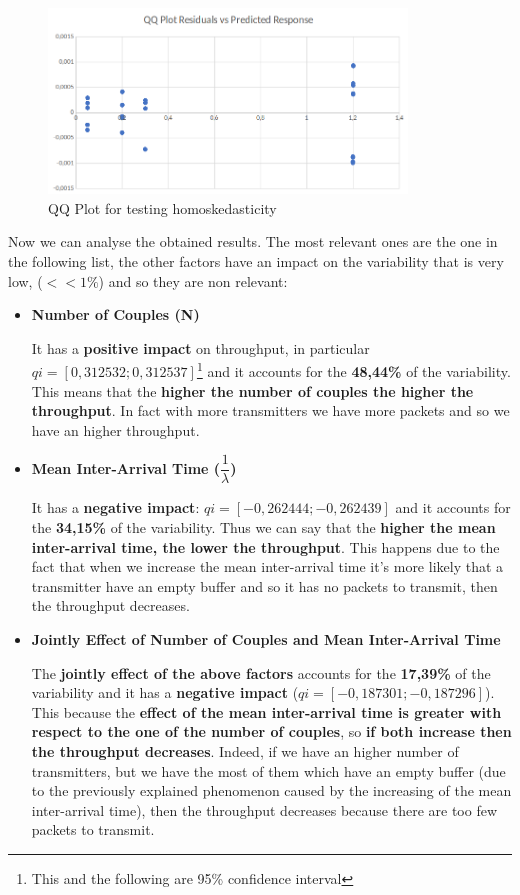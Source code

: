 \begin{figure}[H]
	\centering
	\includegraphics[width=0.85\textwidth]{img/homoskedasticity_2kr_throughput.png}
	\caption{QQ Plot for testing homoskedasticity}
	\label {img: homoskedasticity_throughput}
\end{figure}

\noindent Now we can analyse the obtained results. The most relevant ones are the one in the following list, the other factors have an impact on the variability that is very low, ($<<1\%$) and so they are non relevant:

\begin{itemize}
	\item \textbf{Number of Couples (N)}
	
	\noindent It has a \textbf{positive impact} on throughput, in particular $qi = [0,312532; 0,312537]$\footnote{This and the following are 95\% confidence interval} and it accounts for the \textbf{48,44\%} of the variability. This means that the \textbf{higher the number of couples the higher the throughput}. In fact with more transmitters we have more packets and so we have an higher throughput.
	 
	\item \textbf{Mean Inter-Arrival Time ($\dfrac{1}{\lambda}$)}
	
	\noindent It has a \textbf{negative impact}: $qi = [-0,262444; -0,262439]$ and it accounts for the \textbf{34,15\%} of the variability. Thus we can say that the \textbf{higher the mean inter-arrival time, the lower the throughput}. This happens due to the fact that when we increase the mean inter-arrival time it's more likely that a transmitter have an empty buffer and so it has no packets to transmit, then the throughput decreases. 
	
	\item \textbf{Jointly Effect of Number of Couples and Mean Inter-Arrival Time}
	
	\noindent The \textbf{jointly effect of the above factors} accounts for the \textbf{17,39\%} of the variability and it has a \textbf{negative impact} ($qi = [-0,187301; -0,187296]$). This because the \textbf{effect of the mean inter-arrival time is greater with respect to the one of the number of couples}, so \textbf{if both increase then the throughput decreases}. Indeed, if we have an higher number of transmitters, but we have the most of them which have an empty buffer (due to the previously explained phenomenon caused by the increasing of the mean inter-arrival time), then the throughput decreases because there are too few packets to transmit.
\end{itemize}

